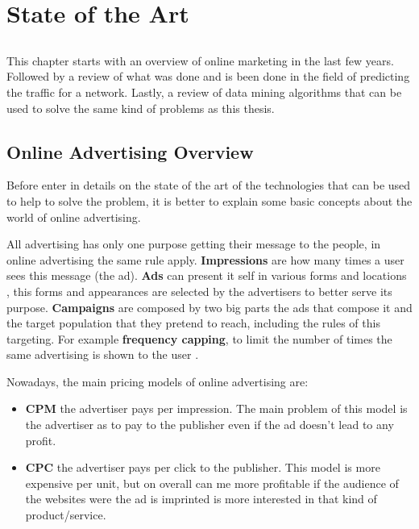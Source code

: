 \chapter{State of the Art} \label{chap:sota}

\section*{}

This chapter starts with an overview of online marketing in the last few years.
Followed by a review of what was done and is been done in the field of predicting the traffic for a network.
Lastly, a review of data mining algorithms that can be used to solve the same kind of problems as this thesis.

\section{Online Advertising Overview}

Before enter in details on the state of the art of the technologies that can be used to help to solve the problem, it is better to explain
some basic concepts about the world of online advertising. 

All advertising has only one purpose getting their message to the people, in online advertising the same rule apply. \textbf{Impressions} are how
many times a user sees this message (the ad).\cite{kOA} \textbf{Ads} can present it self in various forms and locations \cite{kOA2}, this forms and appearances
\cite{kOA3} are selected by the advertisers to better serve its purpose. 
\textbf{Campaigns} are composed by two big parts the ads that compose it and the target population that they pretend to reach, including the rules of this targeting.
For example \textbf{frequency capping}, to limit the number of times the same advertising is shown to the user \cite{kOA}.

Nowadays, the main pricing models of online advertising are:
\begin{itemize}
\item\textbf{CPM} the advertiser pays per impression. The main problem of this model is the advertiser as to pay to the publisher even if the ad doesn't lead to any profit.
\item\textbf{CPC} the advertiser pays per click to the publisher. This model is more expensive per unit\cite{Performics}, but on overall can me more
profitable\cite{Performics} if the audience of the websites were the ad is imprinted is more interested in that kind of product/service\cite{Andrea2004}.
\end{itemize}


